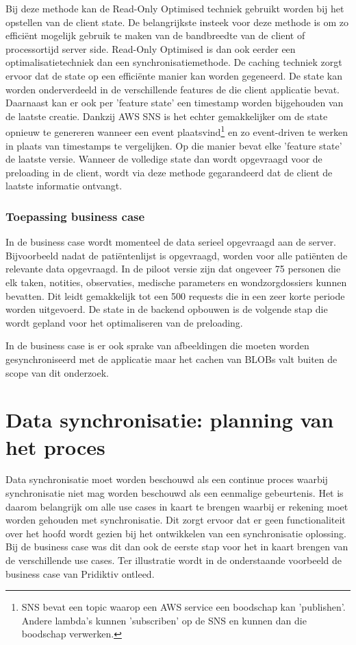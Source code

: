 Bij deze methode kan de Read-Only Optimised techniek gebruikt worden bij het opstellen van de client state. De belangrijkste insteek voor deze methode is om zo effici\"ent mogelijk gebruik te maken van de bandbreedte van de client of processortijd server side. Read-Only Optimised is dan ook eerder een optimalisatietechniek dan een synchronisatiemethode. De caching techniek zorgt ervoor dat de state op een effici\"ente manier kan worden gegeneerd. De state kan worden onderverdeeld in de verschillende features de die client applicatie bevat. Daarnaast kan er ook per 'feature state' een timestamp  worden bijgehouden van de laatste creatie. Dankzij AWS SNS is het echter gemakkelijker om de state opnieuw te genereren wanneer een event plaatsvind\footnote{SNS bevat een topic waarop een AWS service een boodschap kan 'publishen'. Andere lambda's kunnen 'subscriben' op de SNS en kunnen dan die boodschap verwerken.} en zo event-driven te werken in plaats van timestamps te vergelijken. Op die manier bevat elke 'feature state' de laatste versie. Wanneer de volledige state dan wordt opgevraagd voor de preloading in de client, wordt via deze methode gegarandeerd dat de client de laatste informatie ontvangt.

\subsubsection{Toepassing business case}
In de business case wordt momenteel de data serieel opgevraagd aan de server. Bijvoorbeeld nadat de pati\"entenlijst is opgevraagd, worden voor alle pati\"enten de relevante data opgevraagd. In de piloot versie zijn dat ongeveer 75 personen die elk taken, notities, observaties, medische parameters en wondzorgdossiers kunnen bevatten. Dit leidt gemakkelijk tot een 500 requests die in een zeer korte periode worden uitgevoerd. De state in de backend opbouwen is de volgende stap die wordt gepland voor het optimaliseren van de preloading. 

In de business case is er ook sprake van afbeeldingen die moeten worden gesynchroniseerd met de applicatie maar het cachen van BLOBs valt buiten de scope van dit onderzoek.

\section{Data synchronisatie: planning van het proces}
Data synchronisatie moet worden beschouwd als een continue proces\autocite{data-integration-steps} waarbij synchronisatie niet mag worden beschouwd als een eenmalige gebeurtenis. Het is daarom belangrijk om alle use cases in kaart te brengen waarbij er rekening moet worden gehouden met synchronisatie. Dit zorgt ervoor dat er geen functionaliteit over het hoofd wordt gezien bij het ontwikkelen van een synchronisatie oplossing. Bij de business case was dit dan ook de eerste stap voor het in kaart brengen van de verschillende use cases. Ter illustratie wordt in de onderstaande voorbeeld de business case van Pridiktiv ontleed.

